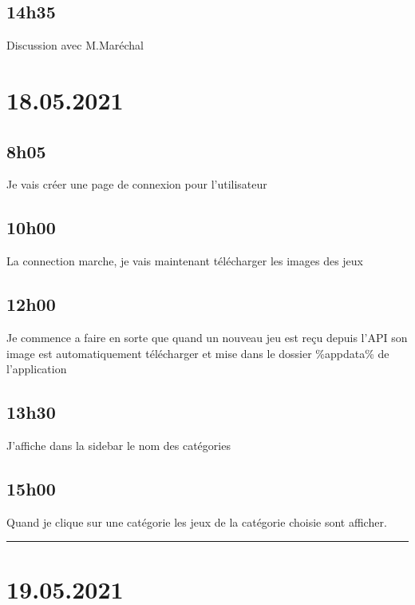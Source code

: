\documentclass[a4paper,12pt,french]{sphinxmanual}
\begin{document}
\subsection{14h35}
\label{\detokenize{logbook:id122}}
\sphinxAtStartPar
Discussion avec M.Maréchal


\section{18.05.2021}
\label{\detokenize{logbook:id123}}

\subsection{8h05}
\label{\detokenize{logbook:id124}}
\sphinxAtStartPar
Je vais créer une page de connexion pour l’utilisateur


\subsection{10h00}
\label{\detokenize{logbook:id125}}
\sphinxAtStartPar
La connection marche, je vais maintenant télécharger les images des jeux


\subsection{12h00}
\label{\detokenize{logbook:id126}}
\sphinxAtStartPar
Je commence a faire en sorte que quand un nouveau jeu est reçu depuis l’API son image est automatiquement télécharger et mise dans le dossier \%appdata\% de l’application


\subsection{13h30}
\label{\detokenize{logbook:id127}}
\sphinxAtStartPar
J’affiche dans la sidebar le nom des catégories


\subsection{15h00}
\label{\detokenize{logbook:id128}}
\sphinxAtStartPar
Quand je clique sur une catégorie les jeux de la catégorie choisie sont afficher.


\bigskip\hrule\bigskip



\section{19.05.2021}
\label{\detokenize{logbook:id129}}
\end{document}
